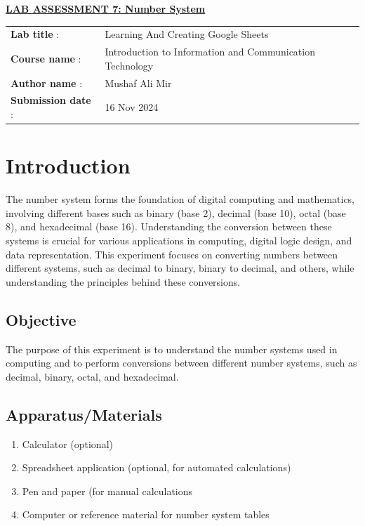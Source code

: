 \documentclass[a4paper,9pt]{article}
\begin{document}
\begin{center}
	{\Huge \bfseries \underline{ LAB ASSESSMENT 7: Number System} \par}
\end{center}
\noindent\begin{tabular}{@{}ll}
	\textbf{Lab title} :&Learning And Creating Google Sheets \\
	\textbf{Course name} :&  Introduction to Information and Communication Technology\\
	\textbf{Author name} : & Mushaf Ali Mir\\
	\textbf{Submission date} :& 16 Nov 2024 \\
\end{tabular}

\section*{Introduction}
\setcounter{section}{7}
\setcounter{figure}{0}  %
\setcounter{subsection}{0}

The number system forms the foundation of digital computing and mathematics, involving different bases such as binary (base 2), decimal (base 10), octal (base 8), and hexadecimal (base 16). Understanding the conversion between these systems is crucial for various applications in computing, digital logic design, and data representation. This experiment focuses on converting numbers between different systems, such as decimal to binary, binary to decimal, and others, while understanding the principles behind these conversions.

\subsection{Objective}
The purpose of this experiment is to understand the number systems used in computing and to perform conversions between different number systems, such as decimal, binary, octal, and hexadecimal.

\subsection{Apparatus/Materials}
\begin{enumerate}
	\item Calculator (optional)
	\item Spreadsheet application (optional, for automated calculations)
	\item Pen and paper (for manual calculations
	\item Computer or reference material for number system tables
	
\end{enumerate}
\end{document}
